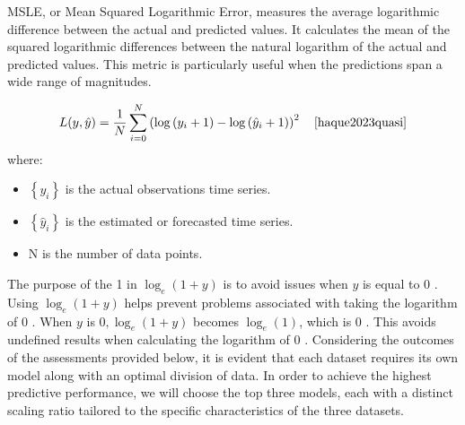 \documentclass{ieeeojies}
\begin{document}
MSLE, or Mean Squared Logarithmic Error, measures the average logarithmic difference between the actual and predicted values. It calculates the mean of the squared logarithmic differences between the natural logarithm of the actual and predicted values. This metric is particularly useful when the predictions span a wide range of magnitudes.

$$
\begin{gathered}
    L(y, \hat{y})=\frac{1}{N} \sum_{i=0}^N\left(\log \left(y_i+1\right)-\log \left(\hat{y}_i+1\right)\right)^2 \quad \cite{haque2023quasi}
\end{gathered}
$$
where:
 \begin{itemize}
     \item $\left\{y_i\right\}$ is the actual observations time series.
     \item $\left\{\hat{y}_i\right\}$ is the estimated or forecasted time series.
     \item $\mathrm{N}$ is the number of data points.
 \end{itemize}
The purpose of the 1 in $\log _e(1+y)$ is to avoid issues when $y$ is equal to 0 . Using $\log _e(1+y)$ helps prevent problems associated with taking the logarithm of 0 . When $y$ is $0, \log _e(1+y)$ becomes $\log _e(1)$, which is 0 . This avoids undefined results when calculating the logarithm of 0 .
Considering the outcomes of the assessments provided below, it is evident that each dataset requires its own model along with an optimal division of data. In order to achieve the highest predictive performance, we will choose the top three models, each with a distinct scaling ratio tailored to the specific characteristics of the three datasets.
\end{document}
